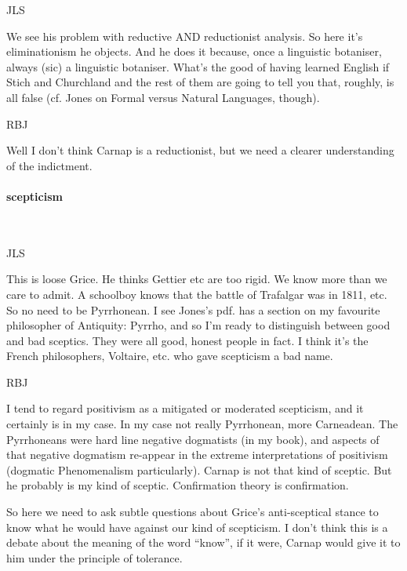 \documentclass[10pt,titlepage]{book}
\begin{document}
JLS

We see his problem with reductive AND reductionist analysis.  
So here it's eliminationism he objects. And he does it because, once a  
linguistic botaniser, always (sic) a linguistic botaniser. What's the good of  
having learned English if Stich and Churchland and the rest of them are 
going to  tell you that, roughly, is all false (cf. Jones on Formal versus 
Natural  Languages, though).

RBJ

Well I don't think Carnap is a reductionist, but we need a clearer understanding of the indictment.

\paragraph{scepticism}\ 

JLS

This is loose Grice. He thinks Gettier etc are too rigid. We  
know more than we care to admit. A schoolboy knows that the battle of 
Trafalgar  was in 1811, etc. So no need to be Pyrrhonean. I see Jones's pdf. has a 
section  on my favourite philosopher of Antiquity: Pyrrho, and so I'm ready 
to  distinguish between good and bad sceptics. They were all good, honest 
people in  fact. I think it's the French philosophers, Voltaire, etc. who gave 
scepticism a  bad name.

RBJ

I tend to regard positivism as a mitigated or moderated scepticism, and it certainly is in my case.
In my case not really Pyrrhonean, more Carneadean.
The Pyrrhoneans were hard line negative dogmatists (in my book), and aspects of that negative dogmatism re-appear in the extreme interpretations of positivism (dogmatic Phenomenalism particularly).
Carnap is not that kind of sceptic.
But he probably is my kind of sceptic.
Confirmation theory is confirmation.

So here we need to ask subtle questions about Grice's anti-sceptical stance to know what he would have against our kind of scepticism.
I don't think this is a debate about the meaning of the word ``know'', if it were, Carnap would give it to him under the principle of tolerance.
\end{document}
